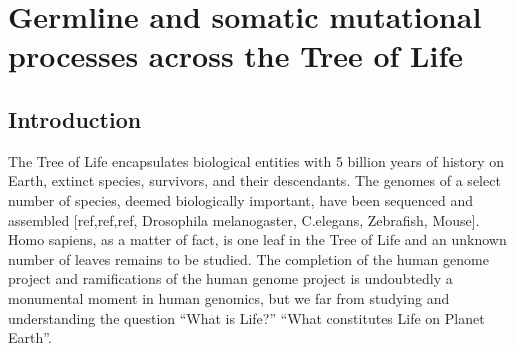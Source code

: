 \chapter{Germline and somatic mutational processes across the Tree of Life}

\ifpdf
    \graphicspath{{Chapter3/Figs/Raster/}{Chapter3/Figs/PDF/}{Chapter3/Figs/}}
\else
    \graphicspath{{Chapter3/Figs/Vector/}{Chapter3/Figs/}}
\fi


\section{Introduction}

The Tree of Life encapsulates biological entities with 5 billion years of history on Earth, extinct species, survivors, and their descendants. The genomes of a select number of species, deemed biologically important, have been sequenced and assembled [ref,ref,ref, Drosophila melanogaster, C.elegans, Zebrafish, Mouse].  Homo sapiens, as a matter of fact, is one leaf in the Tree of Life and an unknown number of leaves remains to be studied. The completion of the human genome project and ramifications of the human genome project is undoubtedly a monumental moment in human genomics, but we far from studying and understanding the question “What is Life?” “What constitutes Life on Planet Earth”.



